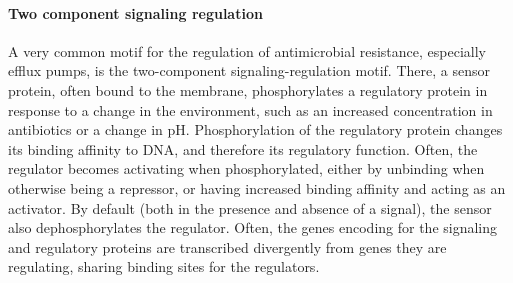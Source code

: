 \documentclass[11.5pt]{report} %
\begin{document}
\paragraph{Two component signaling regulation}
A very common motif for the regulation of antimicrobial resistance, especially efflux pumps, is the two-component signaling-regulation motif. There, a sensor protein, often bound to the membrane, phosphorylates a regulatory protein in response to a change in the environment, such as an increased concentration in antibiotics or a change in pH. Phosphorylation of the regulatory protein changes its binding affinity to DNA, and therefore its regulatory function. Often, the regulator becomes activating when phosphorylated, either by unbinding when otherwise being a repressor, or having increased binding affinity and acting as an activator. By default (both in the presence and absence of a signal), the sensor also dephosphorylates the regulator. Often, the genes encoding for the signaling and regulatory proteins are transcribed divergently from genes they are regulating, sharing binding sites for the regulators.
\end{document}
